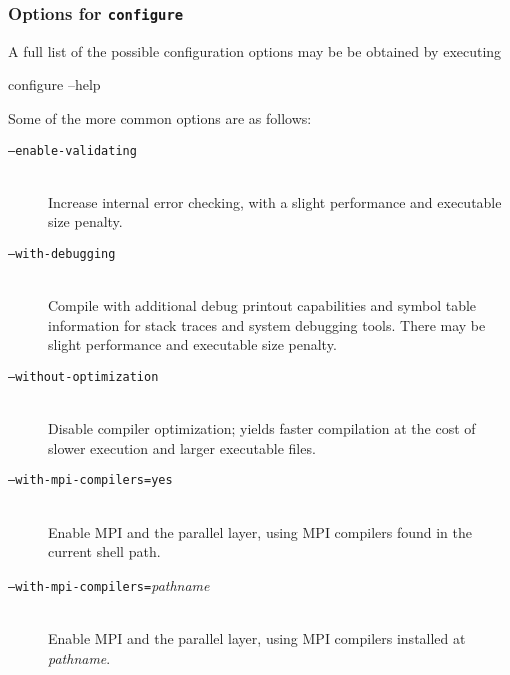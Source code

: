\subsubsection{Options for \texttt{configure}}
\label{sec:configoptions}
\label{sec:confopts}
A full list of the possible configuration options may be be obtained
by executing
\begin{codeblock}
configure --help
\end{codeblock}
Some of the more common options are as follows:
\begin{description}
\item[\texttt{--enable-validating}] ~ \\
Increase internal error checking, with a slight performance and
executable size penalty.  
\item[\texttt{--with-debugging}] ~ \\
Compile with additional debug printout capabilities and symbol table
information for stack traces and system debugging tools.  There may
be slight performance and executable size penalty.
\item[\texttt{--without-optimization}] ~ \\
Disable compiler optimization; yields faster compilation at the cost
of slower execution and larger executable files.
\item[\texttt{--with-mpi-compilers=yes}] ~ \\
Enable MPI and the parallel layer, using MPI compilers found in the
current shell path.
\item[\texttt{--with-mpi-compilers=}\textmd{\emph{pathname}}] ~ \\ Enable MPI
and the parallel layer, using MPI compilers installed at
\emph{pathname}.
\end{description}
